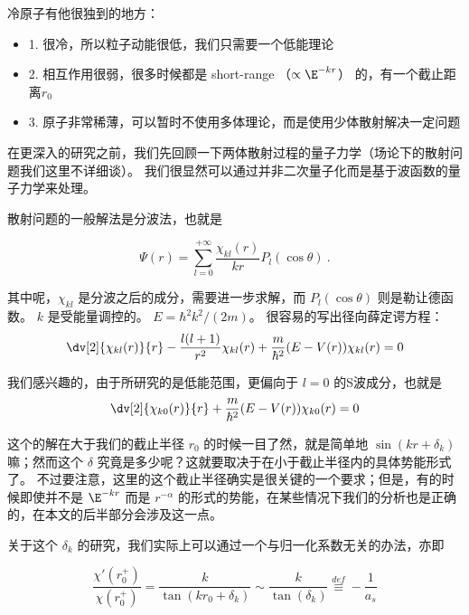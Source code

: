 
冷原子有他很独到的地方：
\begin{itemize}
\item 1. 很冷，所以粒子动能很低，我们只需要一个低能理论
\item 2. 相互作用很弱，很多时候都是 short-range （$\propto \E^{-kr}$） 的，有一个截止距离$r_0$
\item 3. 原子非常稀薄，可以暂时不使用多体理论，而是使用少体散射解决一定问题
\end{itemize}

在更深入的研究之前，我们先回顾一下两体散射过程的量子力学（场论下的散射问题我们这里不详细谈）。 我们很显然可以通过并非二次量子化而是基于波函数的量子力学来处理。

散射问题的一般解法是分波法，也就是

\begin{equation}
\Psi(r) = \sum_{l=0}^{+\infty}\frac{\chi_{kl}(r)}{kr}P_l(\cos\theta) ~.
\end{equation}

其中呢，$\chi_{kl}$ 是分波之后的成分，需要进一步求解，而 $P_l(\cos\theta)$ 则是勒让德函数。 $k$ 是受能量调控的。 $E=\hbar^2 k^2/(2m)$。 很容易的写出径向薛定谔方程：
\begin{equation}
\dv[2]{\chi_{kl}(r)}{r} - \frac{l(l+1)}{r^2}\chi_{kl}(r) + \frac{m}{\hbar^2}(E-V(r))\chi_{kl}(r) = 0
\end{equation}

我们感兴趣的，由于所研究的是低能范围，更偏向于 $l=0$ 的S波成分，也就是
\begin{equation}
\dv[2]{\chi_{k0}(r)}{r}+ \frac{m}{\hbar^2}(E-V(r))\chi_{k0}(r) = 0
\end{equation}

这个的解在大于我们的截止半径 $r_0$ 的时候一目了然，就是简单地 $\sin(kr + \delta_k)$ 嘛；然而这个 $\delta$ 究竟是多少呢？这就要取决于在小于截止半径内的具体势能形式了。 不过要注意，这里的这个截止半径确实是很关键的一个要求；但是，有的时候即使并不是 $\E^{-kr}$ 而是 $r^{-\alpha}$ 的形式的势能，在某些情况下我们的分析也是正确的，在本文的后半部分会涉及这一点。

关于这个 $\delta_k$ 的研究，我们实际上可以通过一个与归一化系数无关的办法，亦即

\begin{equation}
\frac{\chi'(r_0^+)}{\chi(r_0^+)} = \frac{k}{\tan(k r_0 +\delta_k)} \sim \frac{k}{\tan(\delta_k)} \overset{def}{\equiv} -\frac{1}{a_s} 
\end{equation}

